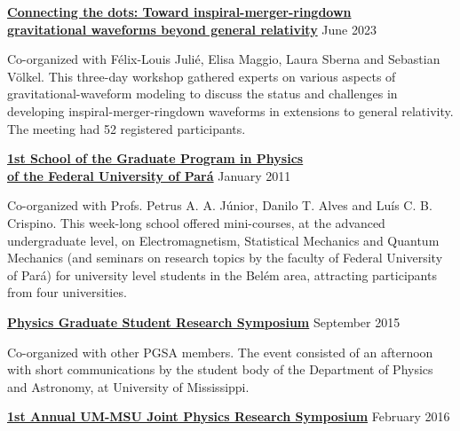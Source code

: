 \documentclass[11pt]{article}
\newcommand{\halfblankline}{\quad\vspace{-0.5\baselineskip}\pagebreak[3]}
\begin{document}
\halfblankline

\href{https://workshops.aei.mpg.de/connecting-the-dots/}
{\textbf{Connecting the dots: Toward inspiral-merger-ringdown \\ gravitational waveforms beyond general relativity}}
\hfill{June 2023}

\begin{innerlist}
    \item Co-organized with F\'elix-Louis Juli\'e, Elisa Maggio, Laura Sberna
        and Sebastian V\"olkel. This three-day workshop gathered experts on
        various aspects of gravitational-waveform modeling to discuss the
        status and challenges in developing inspiral-merger-ringdown waveforms
        in extensions to general relativity. The meeting had 52 registered participants.
\end{innerlist}

\halfblankline

\href{http://www.ufpa.br/ppgf/ippgf.html}
{\textbf{1st School of the Graduate Program in Physics \\ of the Federal University of Par\'a}}
\hfill{January 2011}

\begin{innerlist}
    \item Co-organized with Profs. Petrus A. A. J\'unior,
    Danilo T. Alves and Lu\'is C. B. Crispino. This week-long school offered
    mini-courses, at the advanced undergraduate level, on Electromagnetism,
    Statistical Mechanics and Quantum Mechanics (and seminars on research
    topics by the faculty of Federal University of Par\'a) for
    university level students in the Bel\'em area, attracting participants
    from four universities.
\end{innerlist}

\halfblankline

\href{http://dos.orgsync.com/org/pgsa/ResearchSymposium2015}
{\textbf{Physics Graduate Student Research Symposium}}
\hfill{September 2015}

\begin{innerlist}
    \item Co-organized with other PGSA members. The event consisted of an afternoon
    with short communications by the student body of the Department of Physics and
    Astronomy, at University of Mississippi.
\end{innerlist}

\halfblankline

\href{http://dos.orgsync.com/org/pgsa/UM_MSU_SYMP}
{\textbf{1st Annual UM-MSU Joint Physics Research Symposium}}
\hfill{February 2016}
\end{document}
